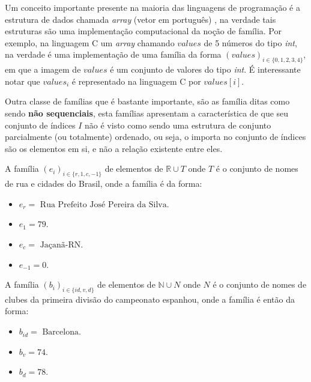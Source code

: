 \begin{nota}
	Um conceito importante presente na maioria das linguagens de programação é a estrutura de dados chamada \textit{array} (vetor em português) \cite{paulo2009algoritmos, medina2006, pythonOrg, jaime1994}, na verdade tais estruturas são uma implementação computacional da noção de família. Por exemplo, na linguagem C um \textit{array} chamando $values$ de 5 números do tipo \textit{int}, na verdade é uma implementação de uma família da forma $(values)_{i \in \{0,1, 2, 3, 4\}}$, em que a imagem de $values$ é um conjunto de valores do tipo \textit{int}. É interessante notar que $values_i$ é representado na linguagem C por $values[i]$.
\end{nota}

Outra classe de famílias que é bastante importante, são as família ditas como sendo \textbf{não sequenciais}, esta famílias apresentam a característica de que seu conjunto de índices $I$ não é visto como sendo uma estrutura de conjunto parcialmente (ou totalmente) ordenado, ou seja, o importa no conjunto de índices são os elementos em si, e não a relação existente entre eles. 

\begin{exemplo}\label{exe:Familia4}
	A família $(e_i)_{i \in \{r, 1, c, -1\}}$ de elementos de $\mathbb{R} \cup T$ onde $T$ é o conjunto de nomes de rua e cidades do Brasil, onde a família é da forma:
	\begin{itemize}
		\item $e_r = \text{ Rua Prefeito José Pereira da Silva}$.
		\item $e_1 = 79$.
		\item $e_c = \text{ Jaçanã-RN}$.
		\item $e_{-1} = 0$.
	\end{itemize}
\end{exemplo}

\begin{exemplo}\label{exe:Familia5}
	A família $(b_i)_{i \in \{id, v, d\}}$ de elementos de $\mathbb{N} \cup N$ onde $N$ é o conjunto de nomes de clubes da primeira divisão do campeonato espanhou, onde a família é então da forma:
	\begin{itemize}
		\item $b_{id} = \text{ Barcelona}$.
		\item $b_v = 74$.
		\item $b_d = 78$.
	\end{itemize}
\end{exemplo}



